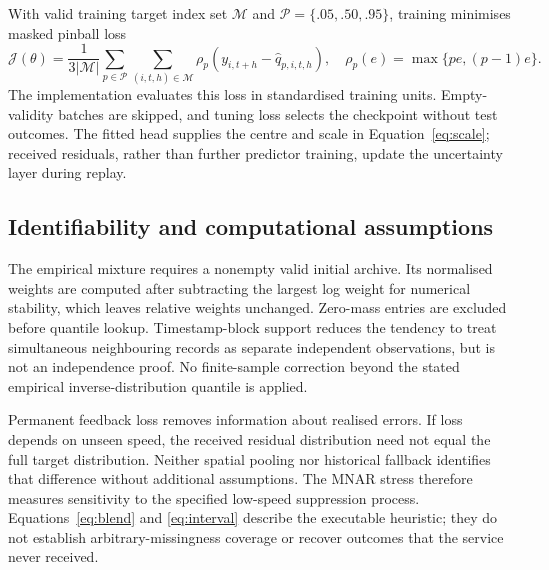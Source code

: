 With valid training target index set $\mathcal M$ and $\mathcal P=\{.05,.50,.95\}$, training minimises masked pinball loss
\begin{equation}
\mathcal J(\theta)=\frac{1}{3|\mathcal M|}\sum_{p\in\mathcal P}\sum_{(i,t,h)\in\mathcal M}
\rho_p(y_{i,t+h}-\widehat q_{p,i,t,h}),\quad
\rho_p(e)=\max\{pe,(p-1)e\}.
\end{equation}
The implementation evaluates this loss in standardised training units. Empty-validity batches are skipped, and tuning loss selects the checkpoint without test outcomes. The fitted head supplies the centre and scale in Equation~\eqref{eq:scale}; received residuals, rather than further predictor training, update the uncertainty layer during replay.

\subsection{Identifiability and computational assumptions}
The empirical mixture requires a nonempty valid initial archive. Its normalised weights are computed after subtracting the largest log weight for numerical stability, which leaves relative weights unchanged. Zero-mass entries are excluded before quantile lookup. Timestamp-block support reduces the tendency to treat simultaneous neighbouring records as separate independent observations, but is not an independence proof. No finite-sample correction beyond the stated empirical inverse-distribution quantile is applied.

Permanent feedback loss removes information about realised errors. If loss depends on unseen speed, the received residual distribution need not equal the full target distribution. Neither spatial pooling nor historical fallback identifies that difference without additional assumptions. The MNAR stress therefore measures sensitivity to the specified low-speed suppression process. Equations~\eqref{eq:blend} and \eqref{eq:interval} describe the executable heuristic; they do not establish arbitrary-missingness coverage or recover outcomes that the service never received.
